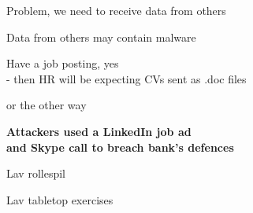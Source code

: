 \documentclass[Screen16to9,17pt]{foils}
\begin{document}
Problem, we need to receive data from others

Data from others may contain malware

Have a job posting, yes\\
- then HR will be expecting CVs sent as .doc files

\slide{}

or the other way

{\Large\bf Attackers used a LinkedIn job ad\\
and Skype call to breach bank’s defences}

{\footnotesize
{}}


\begin{list2}
\item Lav rollespil
\item Lav tabletop exercises
\end{list2}



\begin{center}
\hlkbig

\myname

\end{center}
\end{document}
